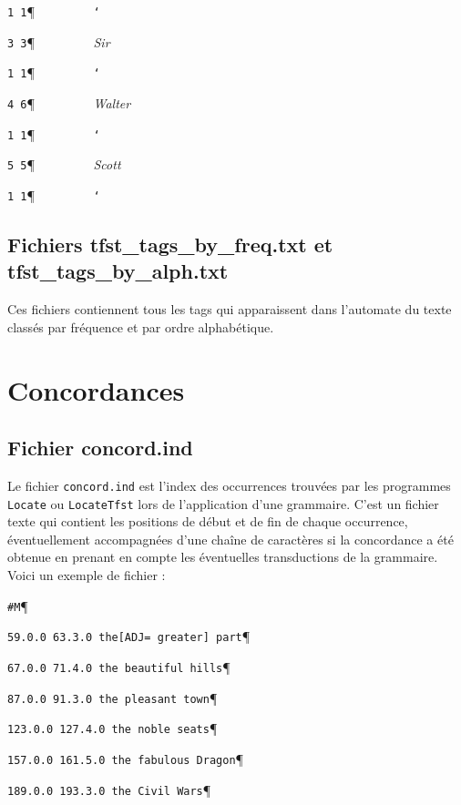 \noindent \verb$1 1$\P \verb$         $\texttt{\char `\ }

\noindent \verb$3 3$\P \verb$         $\textit{Sir}

\noindent \verb$1 1$\P \verb$         $\texttt{\char `\ }

\noindent \verb$4 6$\P \verb$         $\textit{Walter}

\noindent \verb$1 1$\P \verb$         $\texttt{\char `\ }

\noindent \verb$5 5$\P \verb$         $\textit{Scott}

\noindent \verb$1 1$\P \verb$         $\texttt{\char `\ }


\subsection{Fichiers tfst\_tags\_by\_freq.txt et tfst\_tags\_by\_alph.txt}
Ces fichiers contiennent tous les tags qui apparaissent dans l'automate du texte classés par fréquence et par ordre alphabétique.


\section{Concordances}
\subsection{Fichier concord.ind}
Le fichier \verb+concord.ind+ est l’index des occurrences trouvées par les programmes \verb+Locate+
ou \verb+LocateTfst+ lors de l’application d’une grammaire. C’est un fichier texte qui contient les
positions de début et de fin de chaque occurrence, éventuellement accompagnées d’une chaîne de
caractères si la concordance a été obtenue en prenant en compte les éventuelles transductions de la
grammaire. Voici un exemple de fichier :


\bigskip
\verb$#M$\P

\verb$59.0.0 63.3.0 the[ADJ= greater] part$\P

\verb$67.0.0 71.4.0 the beautiful hills$\P

\verb$87.0.0 91.3.0 the pleasant town$\P

\verb$123.0.0 127.4.0 the noble seats$\P

\verb$157.0.0 161.5.0 the fabulous Dragon$\P

\verb$189.0.0 193.3.0 the Civil Wars$\P

